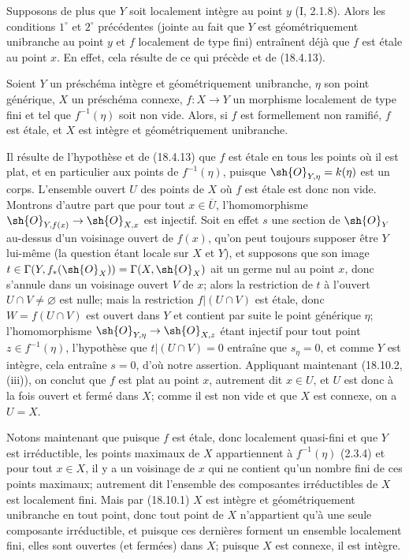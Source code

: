 \begin{remark}[18.10.2]
\begin{enumerate}
Supposons de plus que $Y$ soit localement intègre au point $y$ (I, 2.1.8). Alors les conditions $1^\circ$ et $2^\circ$ précédentes (jointe au fait que $Y$ est géométriquement unibranche au point $y$ et $f$ localement de type fini) entraînent déjà que $f$ est étale au point $x$. En effet, cela résulte de ce qui précède et de (18.4.13).
\end{enumerate}
\end{remark}

\begin{corollary}[18.10.3]
\label{IV.18.10.3}
Soient $Y$ un préschéma intègre et géométriquement unibranche, $\eta$ son point générique, $X$ un préschéma connexe, $f:X\to Y$ un morphisme localement de type fini et tel que $f^{-1}(\eta)$ soit non vide. Alors, si $f$ est formellement non ramifié, $f$ est étale, et $X$ est intègre et géométriquement unibranche.
\end{corollary}

Il résulte de l'hypothèse et de (18.4.13) que $f$ est étale en tous les points où il est plat, et en particulier aux points de $f^{-1}(\eta)$, puisque $\sh{O}_{Y,\eta}=k(\eta)$ est un corps. L'ensemble ouvert $U$ des points de $X$ où $f$ est étale est donc non vide. Montrons d'autre part que pour tout $x\in\overline U$, l'homomorphisme $\sh{O}_{Y,f(x)}\to\sh{O}_{X,x}$ est injectif. Soit en effet $s$ une section de $\sh{O}_Y$ au-dessus d'un voisinage ouvert de $f(x)$, qu'on peut toujours supposer être $Y$ lui-même (la question étant locale sur $X$ et $Y$), et supposons que son image $t\in\Gamma(Y,f_*(\sh{O}_X))=\Gamma(X,\sh{O}_X)$ ait un germe nul au point $x$, donc s'annule dans un voisinage ouvert $V$ de $x$; alors la restriction de $t$ à l'ouvert $U\cap V\neq\varnothing$ est nulle; mais la restriction $f|(U\cap V)$ est étale, donc $W=f(U\cap V)$ est ouvert dans $Y$ et contient par suite le point générique $\eta$; l'homomorphisme $\sh{O}_{Y,\eta}\to\sh{O}_{X,z}$ étant injectif pour tout point $z\in f^{-1}(\eta)$, l'hypothèse que $t|(U\cap V)=0$ entraîne que $s_\eta=0$, et comme $Y$ est intègre, cela entraîne $s=0$, d'où notre assertion. Appliquant maintenant (18.10.2, (iii)), on conclut que $f$ est plat au point $x$, autrement dit $x\in U$, et $U$ est donc à la fois ouvert et fermé dans $X$; comme il est non vide et que $X$ est connexe, on a $U=X$.

Notons maintenant que puisque $f$ est étale, donc localement quasi-fini et que $Y$ est irréductible, les points maximaux de $X$ appartiennent à $f^{-1}(\eta)$ (2.3.4) et pour tout $x\in X$, il y a un voisinage de $x$ qui ne contient qu'un nombre fini de ces points maximaux; autrement dit l'ensemble des composantes irréductibles de $X$ est localement fini. Mais par (18.10.1) $X$ est intègre et géométriquement unibranche en tout point, donc tout point de $X$ n'appartient qu'à une seule composante irréductible, et puisque ces dernières forment un ensemble localement fini, elles sont ouvertes (et fermées) dans $X$; puisque $X$ est connexe, il est intègre.

